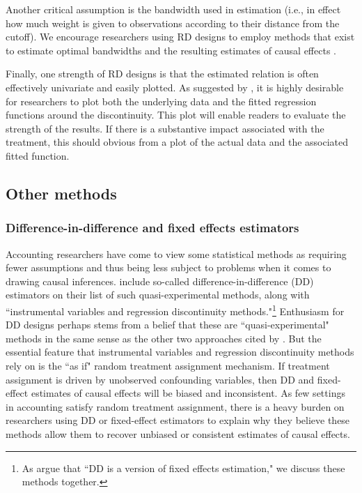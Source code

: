 \documentclass[12pt,reqno,titlepage]{amsart}
\theoremstyle{definition}
\begin{document}
\begin{doublespace}
Another critical assumption is the bandwidth used in estimation (i.e., in effect how much weight is given to observations according to their distance from the cutoff).
We encourage researchers using RD designs to employ methods that exist to estimate optimal bandwidths and the resulting estimates of causal effects \citep[e.g.,][]{Imbens:2011}.

Finally, one strength of RD designs is that the estimated relation is often effectively univariate and easily plotted.
As suggested by \citet{Lee:2010hy}, it is highly desirable for researchers to plot both the underlying data and the fitted regression functions around the discontinuity. This plot will enable readers to evaluate the strength of the results.
If there is a substantive impact associated with the treatment, this should obvious from a plot of the actual data and the associated fitted function.

\subsection{Other methods}

\subsubsection{Difference-in-difference and fixed effects estimators}
Accounting researchers have come to view some statistical methods as requiring fewer assumptions and thus being less subject to problems when it comes to drawing causal inferences. 
\citet[p.\,12]{Angrist:2010jv} include so-called difference-in-difference (DD) estimators on their list of such quasi-experimental methods, along with ``instrumental variables and regression discontinuity methods."\footnote{As \citet[p.\,228]{Angrist:2008vk} argue that ``DD is a version of fixed effects estimation," we discuss these methods together.}
Enthusiasm for DD designs perhaps stems from a belief that these are ``quasi-experimental" methods in the same sense as the other two approaches cited by \citet[p.\,12]{Angrist:2010jv}.
But the essential feature that instrumental variables and regression discontinuity methods rely on is the ``as if" random treatment assignment mechanism.
If treatment assignment is driven by unobserved confounding variables, then DD and fixed-effect estimates of causal effects will be biased and inconsistent. 
As few settings in accounting satisfy random treatment assignment, there is a heavy burden on researchers using DD or fixed-effect estimators to explain why they believe these methods allow them to recover unbiased or consistent estimates of causal effects.


\end{doublespace}
\end{document}

